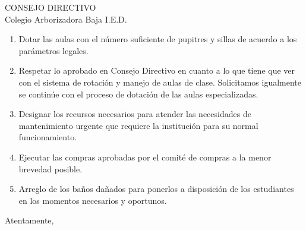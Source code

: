 \documentclass[spanish,11pt]{letter}
\begin{document}
\begin{letter}{CONSEJO DIRECTIVO\\Colegio Arborizadora Baja I.E.D.}
\begin{enumerate}
\item Dotar las aulas con el número suficiente de pupitres y sillas de acuerdo a los parámetros legales.
\item Respetar lo aprobado en Consejo Directivo en cuanto a lo que tiene que ver con el sistema de rotación y manejo de aulas de clase. Solicitamos igualmente se continúe con el proceso de  dotación de las aulas especializadas.
\item Designar los recursos necesarios para atender las necesidades de mantenimiento urgente que requiere la institución para su normal funcionamiento.
\item Ejecutar las compras aprobadas por el comité de compras a la menor brevedad posible.
\item Arreglo de los baños dañados para ponerlos a disposición de los estudiantes en los momentos necesarios y oportunos.
\end{enumerate}

\closing{Atentamente,}


\end{letter}
\end{document}
